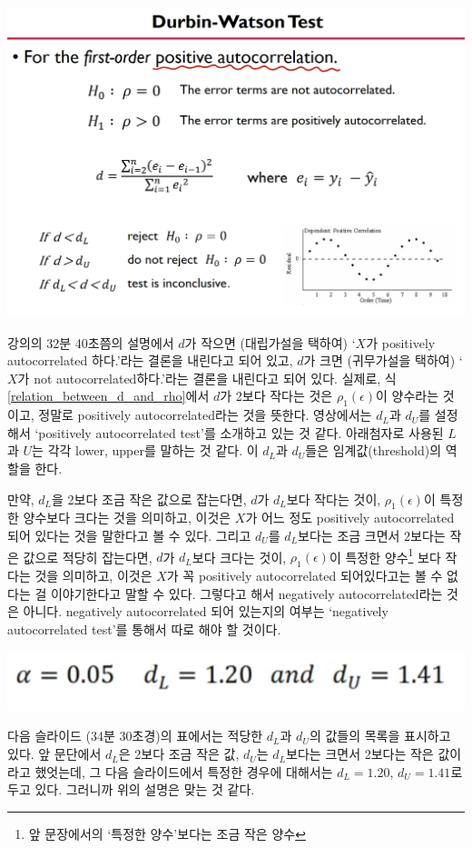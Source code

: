 \documentclass{article}
\begin{document}
\begin{center}
\includegraphics[width=.5\textwidth]{positively_autocorrelated_test}
\end{center}

강의의 32분 40초쯤의 설명에서 \(d\)가 작으면 (대립가설을 택하여) `\(X\)가 positively autocorrelated 하다.'라는 결론을 내린다고 되어 있고, \(d\)가 크면 (귀무가설을 택하여) `\(X\)가 not autocorrelated하다.'라는 결론을 내린다고 되어 있다.
실제로, 식 \eqref{relation_between_d_and_rho}에서 \(d\)가 2보다 작다는 것은 \(\rho_1(\epsilon)\)이 양수라는 것이고, 정말로 positively autocorrelated라는 것을 뜻한다.
영상에서는 \(d_L\)과 \(d_U\)를 설정해서 `positively autocorrelated test'를 소개하고 있는 것 같다.
아래첨자로 사용된 \(L\)과 \(U\)는 각각 lower, upper를 말하는 것 같다.
이 \(d_L\)과 \(d_U\)들은 임계값(threshold)의 역할을 한다.

만약, \(d_L\)을 2보다 조금 작은 값으로 잡는다면, \(d\)가 \(d_L\)보다 작다는 것이, \(\rho_1(\epsilon)\)이 특정한 양수보다 크다는 것을 의미하고, 이것은 \(X\)가 어느 정도 positively autocorrelated 되어 있다는 것을 말한다고 볼 수 있다.
그리고 \(d_U\)를 \(d_L\)보다는 조금 크면서 \(2\)보다는 작은 값으로 적당히 잡는다면, \(d\)가 \(d_L\)보다 크다는 것이, \(\rho_1(\epsilon)\)이 특정한 양수\footnote{앞 문장에서의 `특정한 양수'보다는 조금 작은 양수} 보다 작다는 것을 의미하고, 이것은 \(X\)가 꼭 positively autocorrelated 되어있다고는 볼 수 없다는 걸 이야기한다고 말할 수 있다.
그렇다고 해서 negatively autocorrelated라는 것은 아니다.
negatively autocorrelated 되어 있는지의 여부는 `negatively autocorrelated test'를 통해서 따로 해야 할 것이다.

\begin{center}
\includegraphics[width=.3\textwidth]{d_L_and_d_U}
\end{center}

다음 슬라이드 (34분 30초경)의 표에서는 적당한 \(d_L\)과 \(d_U\)의 값들의 목록을 표시하고 있다.
앞 문단에서 \(d_L\)은 2보다 조금 작은 값, \(d_U\)는 \(d_L\)보다는 크면서 2보다는 작은 값이라고 했엇는데, 그 다음 슬라이드에서 특정한 경우에 대해서는 \(d_L=1.20\), \(d_U=1.41\)로 두고 있다.
그러니까 위의 설명은 맞는 것 같다.
\end{document}
